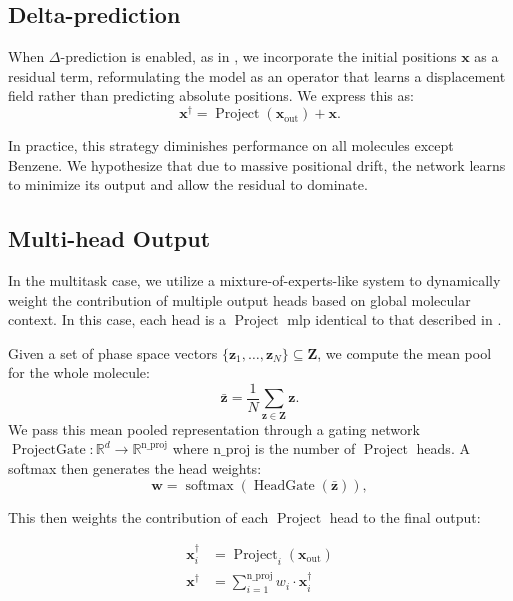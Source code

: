 \subsection{Delta-prediction}
\label{sec:delta_prediction}
When \(\Delta\)-prediction is enabled, as in , we incorporate the initial positions \(\mathbf{x}\) as a residual term, reformulating the model as an operator that learns a displacement field rather than predicting absolute positions. We express this as:
\begin{equation}
    \mathbf{x}^\dagger = \operatorname{Project}(\mathbf{x}_{\text{out}}) + \mathbf{x}.
\end{equation}

In practice, this strategy diminishes performance on all molecules except Benzene. We hypothesize that due to massive positional drift, the network learns to minimize its output and allow the residual to dominate.

\subsection{Multi-head Output}
\label{sec:multi_head_output}
In the multitask case, we utilize a mixture-of-experts-like system to dynamically weight the contribution of multiple output heads based on global molecular context. In this case, each head is a \(\operatorname{Project}\) \gls{mlp} identical to that described in .

Given a set of phase space vectors \(\{ \mathbf{z}_1, \dots, \mathbf{z}_N \} \subseteq \mathbf{Z} \), we compute the mean pool for the whole molecule:
\begin{equation}
    \bar{\mathbf{z}} = \frac{1}{N} \sum\limits_{\mathbf{z} \in \mathbf{Z}} \mathbf{z}.
\end{equation}
We pass this mean pooled representation through a gating network \(\operatorname{ProjectGate} \colon \mathbb{R}^d \to \mathbb{R}^{\text{n\_proj}}\) where \(\text{n\_proj}\) is the number of \(\operatorname{Project}\) heads. A softmax then generates the head weights:
\begin{equation}
    \mathbf{w} = \operatorname{softmax}(\operatorname{HeadGate}(\bar{\mathbf{z}})),
\end{equation}

This then weights the contribution of each \(\operatorname{Project}\) head to the final output:

\begin{align}
    \mathbf{x}_i^\dagger& = \operatorname{Project}_i(\mathbf{x}_\text{out})
    \\
    \mathbf{x}^\dagger &= \sum\limits_{i=1}^{\text{n\_proj}} w_i \cdot \mathbf{x}_i^\dagger
\end{align}


